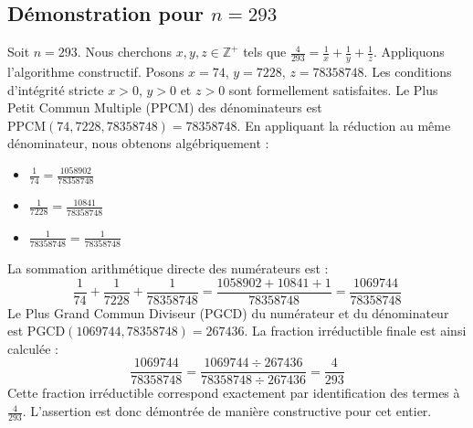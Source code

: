 \documentclass[11pt,a4paper]{article}
\begin{document}
\subsection{Démonstration pour $n = 293$}
Soit $n = 293$. Nous cherchons $x, y, z \in \mathbb{Z}^{+}$ tels que $\frac{4}{293} = \frac{1}{x} + \frac{1}{y} + \frac{1}{z}$.
Appliquons l'algorithme constructif. Posons $x = 74$, $y = 7228$, $z = 78358748$.
Les conditions d'intégrité stricte $x > 0$, $y > 0$ et $z > 0$ sont formellement satisfaites.
Le Plus Petit Commun Multiple (PPCM) des dénominateurs est $\text{PPCM}(74, 7228, 78358748) = 78358748$.
En appliquant la réduction au même dénominateur, nous obtenons algébriquement :
\begin{itemize}
    \item $\frac{1}{74} = \frac{1058902}{78358748}$
    \item $\frac{1}{7228} = \frac{10841}{78358748}$
    \item $\frac{1}{78358748} = \frac{1}{78358748}$
\end{itemize}
La sommation arithmétique directe des numérateurs est :
$$ \frac{1}{74} + \frac{1}{7228} + \frac{1}{78358748} = \frac{1058902 + 10841 + 1}{78358748} = \frac{1069744}{78358748} $$
Le Plus Grand Commun Diviseur (PGCD) du numérateur et du dénominateur est $\text{PGCD}(1069744, 78358748) = 267436$.
La fraction irréductible finale est ainsi calculée :
$$ \frac{1069744}{78358748} = \frac{1069744 \div 267436}{78358748 \div 267436} = \frac{4}{293} $$
Cette fraction irréductible correspond exactement par identification des termes à $\frac{4}{293}$. L'assertion est donc démontrée de manière constructive pour cet entier.
\end{document}
